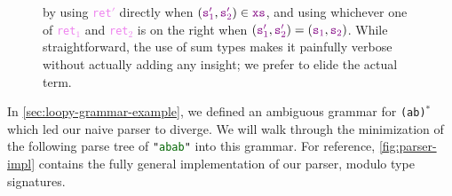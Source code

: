 \documentclass[preprint]{sigplanconf}
\newcommand{\aswidthof}[2]{\rlap{#1}\hphantom{#2}}
\newcommand{\str}[1]{\texttt{"\textcolor{DarkGreen}{#1}"}}
\newcommand{\regex}[1]{\texttt{#1}}
\newcommand{\fname}[1]{\texttt{#1}}
\newcommand{\farg}[1]{\textcolor{violet}{\texttt{#1}}}
\newcommand{\cons}[2]{#1::#2}
\newcommand{\hole}{\texttt{\_}}
\newcommand{\defeq}{\coloneqq}
\newcommand{\testeq}{=}
\newcommand{\afun}[2]{\ensuremath{\lambda~#1.~#2}}
\newcommand{\constructorname}[1]{\texttt{#1}}
\newcommand{\inl}[1]{\constructorname{inl}~#1}
\newcommand{\inr}[1]{\constructorname{inr}~#1}
\newcommand{\inrp}[1]{\inr{(#1)}}
\newcommand{\acase}[3][\big]{~#1|{~{#2}~~\ensuremath{\to}~~{#3}}}
\def\_{\textunderscore}
\begin{document}
\begin{figure*}
  by using \farg{ret$'$} directly when $(\farg{s$'_1$}, \farg{s$'_2$})\in \farg{xs}$, and using whichever one of \farg{ret$_1$} and \farg{ret$_2$} is on the right when $(\farg{s$'_1$}, \farg{s$'_2$}) = (\farg{s$_1$}, \farg{s$_2$})$.  While straightforward, the use of sum types makes it painfully verbose without actually adding any insight; we prefer to elide the actual term.
\end{figure*}

    In \autoref{sec:loopy-grammar-example}, we defined an ambiguous grammar for \regex{(ab)$^*$} which led our naive parser to diverge.  We will walk through the minimization of the following parse tree of \str{abab} into this grammar.  For reference, \autoref{fig:parser-impl} contains the fully general implementation of our parser, modulo type signatures.
\end{document}
